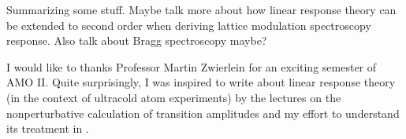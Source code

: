 \documentclass[reprint,
nofootinbib,
amsmath,amssymb,
aps]{revtex4-1}
\begin{document}
Summarizing some stuff. Maybe talk more about how linear response theory can be extended to second order when deriving lattice modulation spectroscopy response. Also talk about Bragg spectroscopy maybe? 


\begin{acknowledgments}
	I would like to thanks Professor Martin Zwierlein for an exciting semester of AMO II. Quite surprisingly, I was inspired to write about linear response theory (in the context of ultracold atom experiments) by the lectures on the nonperturbative calculation of transition amplitudes and my effort to understand its treatment in \cite{cohen1998atom}. 
\end{acknowledgments}



 
\end{document}
